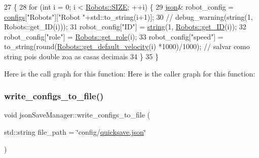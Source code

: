 \begin{DoxyCode}
27                                   \{
28     \textcolor{keywordflow}{for} (\textcolor{keywordtype}{int} i = 0; i < \hyperlink{class_robots_ae9df2f1d345ad6740f0459956cdd4712}{Robots::SIZE}; ++i) \{
29         \hyperlink{classnlohmann_1_1basic__json}{json}& robot\_config = \hyperlink{classjson_save_manager_acfbca58deba9ed712131c20a8f965dfd}{configs}[\textcolor{stringliteral}{"Robots"}][\textcolor{stringliteral}{"Robot "}+std::to\_string(i+1)];
30         \textcolor{comment}{// debug\_warning(string(1, Robots::get\_ID(i)));}
31         robot\_config[\textcolor{stringliteral}{"ID"}] = \hyperlink{namespacenlohmann_1_1detail_a1ed8fc6239da25abcaf681d30ace4985ab45cffe084dd3d20d928bee85e7b0f21}{string}(1, \hyperlink{class_robots_a306bb88b37b41cff35018d51d8228d65}{Robots::get\_ID}(i));
32         robot\_config[\textcolor{stringliteral}{"role"}] = \hyperlink{class_robots_ac5cdd16502bd325581fb2d732169a326}{Robots::get\_role}(i);
33         robot\_config[\textcolor{stringliteral}{"speed"}] = to\_string(round(\hyperlink{class_robots_a3b226dd339a3b7a41c120f7d6a1bc515}{Robots::get\_default\_velocity}(i)
      *1000)/1000); \textcolor{comment}{// salvar como string pois double zoa as casas decimais}
34     \}
35 \}
\end{DoxyCode}
Here is the call graph for this function\+:
Here is the caller graph for this function\+:
\mbox{\label{classjson_save_manager_a2be17d434d72a0afeb2d9a2f96b043bf}} 
\subsubsection{\texorpdfstring{write\+\_\+configs\+\_\+to\+\_\+file()}{write\_configs\_to\_file()}}
{\footnotesize\ttfamily void json\+Save\+Manager\+::write\+\_\+configs\+\_\+to\+\_\+file (\begin{DoxyParamCaption}\item[{std\+::string}]{file\+\_\+path = {\ttfamily \char`\"{}config/\hyperlink{json_save_manager_8h_ab701e3ac61a85b337ec5c1abaad6742d}{quicksave.\+json}\char`\"{}} }\end{DoxyParamCaption})}



